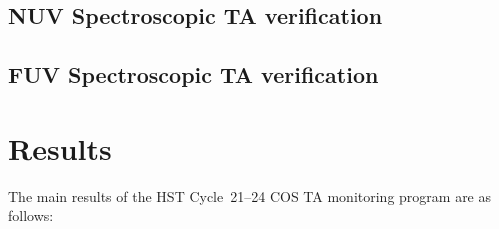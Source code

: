 \documentclass{stsci_report}
\begin{document}


\subsection{NUV Spectroscopic TA verification}\label{subsec:NspVER}
\subsection{FUV Spectroscopic TA verification}\label{subsec:FspVER}

%

\section{Results}\label{sec:results}
The main results of the HST Cycle~21--24 COS TA monitoring program are as follows:
\end{document}
